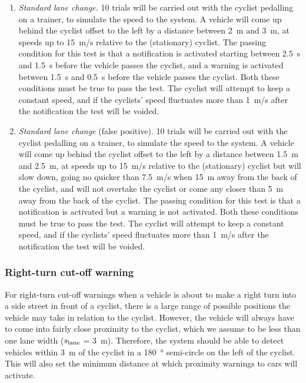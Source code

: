 \documentclass[journal]{IEEEtran}
\begin{document}
\begin{enumerate}
    \item \textit{Standard lane change.} 10 trials will be carried out with the cyclist pedalling on a trainer, to simulate the speed to the system. A vehicle will come up behind the cyclist offset to the left by a distance between \SI{2}{\meter} and \SI{3}{\meter}, at speeds up to \SI{15}{\meter/\s} relative to the (stationary) cyclist. The passing condition for this test is that a notification is activated starting between \SI{2.5}{\s} and \SI{1.5}{\s} before the vehicle passes the cyclist, and a warning is activated between \SI{1.5}{\s} and \SI{0.5}{\s} before the vehicle passes the cyclist. Both these conditions must be true to pass the test. The cyclist will attempt to keep a constant speed, and if the cyclists' speed fluctuates more than \SI{1}{\meter/\s} after the notification the test will be voided.
    
    \item \textit{Standard lane change} (false positive). 10 trials will be carried out with the cyclist pedalling on a trainer, to simulate the speed to the system. A vehicle will come up behind the cyclist offset to the left by a distance between \SI{1.5}{\meter} and \SI{2.5}{\meter}, at speeds up to \SI{15}{\meter/\s} relative to the (stationary) cyclist but will slow down, going no quicker than \SI{7.5}{\meter/\s} when \SI{15}{\meter} away from the back of the cyclist, and will not overtake the cyclist or come any closer than \SI{5}{\meter} away from the back of the cyclist. The passing condition for this test is that a notification is activated but a warning is not activated. Both these conditions must be true to pass the test. The cyclist will attempt to keep a constant speed, and if the cyclists' speed fluctuates more than \SI{1}{\meter/\s} after the notification the test will be voided.
\end{enumerate}

\subsubsection{Right-turn cut-off warning}
For right-turn cut-off warnings when a vehicle is about to make a right turn into a side street in front of a cyclist, there is a large range of possible positions the vehicle may take in relation to the cyclist. However, the vehicle will always have to come into fairly close proximity to the cyclist, which we assume to be less than one lane width ($s_\text{lane}$ = \SI{3}{\meter}). Therefore, the system should be able to detect vehicles within \SI{3}{\meter} of the cyclist in a \SI{180}{\degree} semi-circle on the left of the cyclist. This will also set the minimum distance at which proximity warnings to cars will activate.
\end{document}
